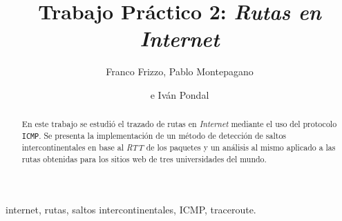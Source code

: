 \documentclass[%
    final,
    notitlepage,
    narroweqnarray,
    inline,
    twoside,
]{ieee}
\begin{document}
\nocite{Jobst}

\title[Trabajo Práctico 2: Rutas en Internet]{%
       Trabajo Práctico 2: \emph{Rutas en Internet}}

\author[FRIZZO, MONTEPAGANO, PONDAL]{Franco Frizzo, Pablo Montepagano
\and{}e Iván Pondal}


\maketitle

\begin{abstract}
    En este trabajo se estudió el trazado de rutas en \emph{Internet} mediante el uso
    del protocolo \texttt{ICMP}. Se presenta la implementación de un método de
    detección de saltos intercontinentales en base al \emph{RTT} de los paquetes y
    un análisis al mismo aplicado a las rutas obtenidas para los sitios web de
    tres universidades del mundo.
\end{abstract}

\begin{keywords}
internet, rutas, saltos intercontinentales, ICMP, traceroute.
\end{keywords}








\end{document}
